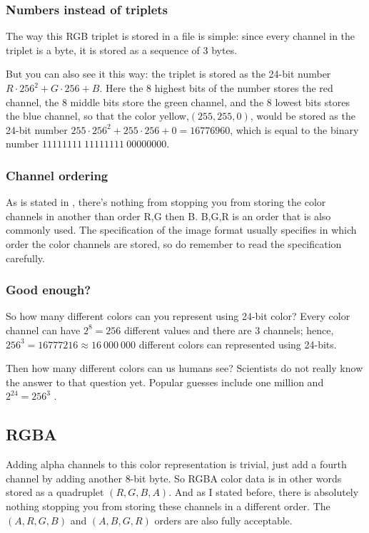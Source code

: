 \subsubsection{Numbers instead of triplets}

The way this RGB triplet is stored in a file is simple: since every
channel in the triplet is a byte, it is stored as a sequence of 3
bytes.

But you can also see it this way: the triplet is stored as the 24-bit
number $R \cdot 256^2 + G \cdot 256 + B$. Here the 8 highest bits of
the number stores the red channel, the 8 middle bits store the green
channel, and the 8 lowest bits stores the blue channel, so that the
color yellow,$(255,255,0)$, would be stored as the 24-bit number $255
\cdot 256^2 + 255 \cdot 256 + 0 = 16776960$, which is equal to the
binary number $11111111\ 11111111\ 00000000$.

\subsubsection{Channel ordering}

As is stated in \cite{murray1996encyclopedia}, there's nothing from
stopping you from storing the color channels in another than order R,G
then B. B,G,R is an order that is also commonly used. The
specification of the image format usually specifies in which order the
color channels are stored, so do remember to read the specification
carefully.

\subsubsection{Good enough?}

So how many different colors can you represent using 24-bit color?
Every color channel can have $2^8 = 256$ different values and there
are $3$ channels; hence, $256^3 = 16777216 \approx 16\ 000\ 000$ different colors
can represented using 24-bits.

Then how many different colors can us humans see? Scientists do not
really know the answer to that question yet. Popular guesses include
one million \cite{roth:_tetrachromat} and $2^{24} = 256^3$
\cite{murray1996encyclopedia}.

\subsection{RGBA}

Adding alpha channels to this color representation is trivial, just
add a fourth channel by adding another 8-bit byte. So RGBA color data
is in other words stored as a quadruplet $(R,G,B,A)$. And as I stated
before, there is absolutely nothing stopping you from storing these
channels in a different order. The $(A,R,G,B)$ and $(A,B,G,R)$ orders
are also fully acceptable.


